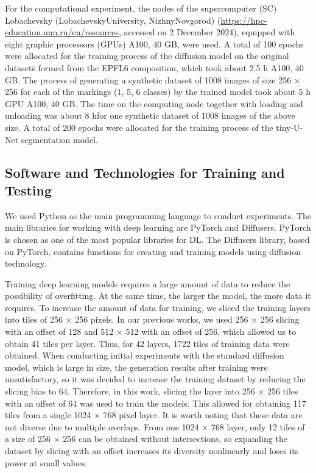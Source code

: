 \documentclass[journal,article,submit,pdftex,moreauthors]{Definitions/mdpi}
\begin{document}
For the computational experiment, the nodes of the supercomputer (SC) Lobachevsky (LobachevskyUniversity, NizhnyNovgorod) (\href{https://hpc-education.unn.ru/en/resources}{https://hpc-education.unn.ru/en/resources}, accessed on 2 December 2024), equipped with eight graphic processors (GPUs) A100, 40 GB, were used. A total of 100 epochs were allocated for the training process of the diffusion model on the original datasets formed from the EPFL6 composition, which took about 2.5 h A100, 40 GB. The process of generating a synthetic dataset of 1008 images of size 256 × 256 for each of the markings (1, 5, 6 classes) by the trained model took about 5 h GPU A100, 40 GB. The time on the computing node together with loading and unloading was about 8 hfor one synthetic dataset of 1008 images of the above size. A total of 200 epochs were allocated for the training process of the tiny-U-Net segmentation model.

\subsection{Software and Technologies for Training and Testing}

We used Python as the main programming language to conduct experiments. The main libraries for working with deep learning are PyTorch and Diffusers. PyTorch is chosen as one of the most popular libraries for DL. The Diffusers library, based on PyTorch, contains functions for creating and training models using diffusion technology.

Training deep learning models requires a large amount of data to reduce the possibility of overfitting. At the same time, the larger the model, the more data it requires. To increase the amount of data for training, we sliced the training layers into tiles of 256 × 256 pixels. In our previous works, we used 256 × 256 slicing with an offset of 128 and 512 × 512 with an offset of 256, which allowed us to obtain 41 tiles per layer. Thus, for 42 layers, 1722 tiles of training data were obtained. When conducting initial experiments with the standard diffusion model, which is large in size, the generation results after training were unsatisfactory, so it was decided to increase the training dataset by reducing the slicing bias to 64. Therefore, in this work, slicing the layer into 256 × 256 tiles with an offset of 64 was used to train the models. This allowed for obtaining 117 tiles from a single 1024 × 768 pixel layer. It is worth noting that these data are not diverse due to multiple overlaps. From one 1024 × 768 layer, only 12 tiles of a size of 256 × 256 can be obtained without intersections, so expanding the dataset by slicing with an offset increases its diversity nonlinearly and loses its power at small values.
\end{document}
